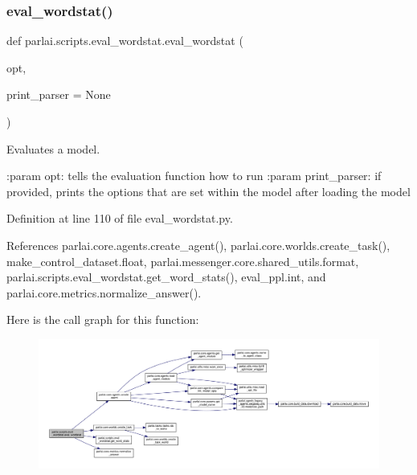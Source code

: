 \subsubsection{\texorpdfstring{eval\+\_\+wordstat()}{eval\_wordstat()}}
{\footnotesize\ttfamily def parlai.\+scripts.\+eval\+\_\+wordstat.\+eval\+\_\+wordstat (\begin{DoxyParamCaption}\item[{}]{opt,  }\item[{}]{print\+\_\+parser = {\ttfamily None} }\end{DoxyParamCaption})}

\begin{DoxyVerb}Evaluates a model.

:param opt: tells the evaluation function how to run
:param print_parser: if provided, prints the options that are set within the
    model after loading the model
\end{DoxyVerb}
 

Definition at line 110 of file eval\+\_\+wordstat.\+py.



References parlai.\+core.\+agents.\+create\+\_\+agent(), parlai.\+core.\+worlds.\+create\+\_\+task(), make\+\_\+control\+\_\+dataset.\+float, parlai.\+messenger.\+core.\+shared\+\_\+utils.\+format, parlai.\+scripts.\+eval\+\_\+wordstat.\+get\+\_\+word\+\_\+stats(), eval\+\_\+ppl.\+int, and parlai.\+core.\+metrics.\+normalize\+\_\+answer().

Here is the call graph for this function\+:
\nopagebreak
\begin{figure}[H]
\begin{center}
\leavevmode
\includegraphics[width=350pt]{namespaceparlai_1_1scripts_1_1eval__wordstat_abdad0c3df5ffa1768c0d5822d3668ba0_cgraph}
\end{center}
\end{figure}
\mbox{\label{namespaceparlai_1_1scripts_1_1eval__wordstat_ab2d96b5ac07c988934a0320739fc3c60}} 
